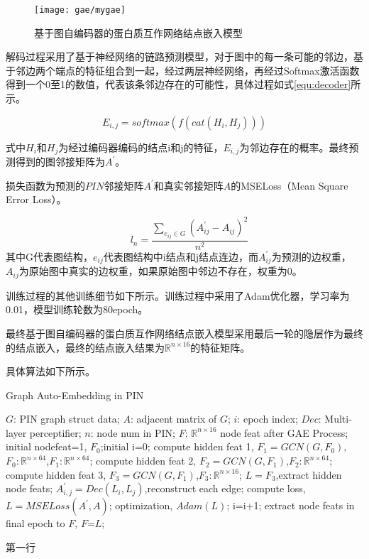 \begin{figure}[htbp]
    \centering
    \texttt{[image: gae/mygae]}
    \caption{基于图自编码器的蛋白质互作网络结点嵌入模型}
    \label{fig:gae/mygae}
\end{figure}

解码过程采用了基于神经网络的链路预测模型，对于图中的每一条可能的邻边，基于邻边两个端点的特征组合到一起，经过两层神经网络，再经过Softmax激活函数得到一个0至1的数值，代表该条邻边存在的可能性，具体过程如式\ref{equ:decoder}所示。

\begin{equation}
    \label{equ:decoder}
    E_{i,j} =softmax(f(cat(H_i,H_j)))
\end{equation}

式中$H_i$和$H_j$为经过编码器编码的结点i和j的特征，$E_{i,j}$为邻边存在的概率。最终预测得到的图邻接矩阵为$A^{\prime}$。


损失函数为预测的$PIN$邻接矩阵$A^{\prime}$和真实邻接矩阵$A$的MSELoss（Mean Square Error Loss）。

\begin{equation}
    \label{equ:autoembedloss}
    \quad l_n =\frac{\sum_{e_{ij}\in G}{  \left( A_{ij}^{\prime} - A_{ij} \right)^2}}{n^2}
\end{equation}
其中G代表图结构，$e_{ij}$代表图结构中i结点和j结点连边，而$A_{ij}^{\prime}$为预测的边权重，$A_{ij}$为原始图中真实的边权重，如果原始图中邻边不存在，权重为0。


训练过程的其他训练细节如下所示。训练过程中采用了Adam优化器，学习率为0.01，模型训练轮数为80epoch。

最终基于图自编码器的蛋白质互作网络结点嵌入模型采用最后一轮的隐层作为最终的结点嵌入，最终的结点嵌入结果为$\mathbb{R}^{n\times 16}$的特征矩阵。

具体算法如下所示。

\begin{algorithm}[h]
    \caption{Graph Auto-Embedding in PIN} %
    \label{alg::gae}
    \begin{algorithmic}[1]
        \Require
        $G$: PIN graph struct data;
        $A$: adjacent matrix of $G$;
        $i$: epoch index;
        $Dec$: Multi-layer perceptifier;
        $n$: node num in PIN;
        \Ensure
        $F$: $\mathbb{R}^{n\times 16}$ node feat after GAE Process;
        \State initial nodefeat=1, $F_0$;initial i=0;
        \Repeat
        \State compute hidden feat 1, $F_1=GCN(G,F_0)$,$F_0:\mathbb{R}^{n\times 64}$,$F_1:\mathbb{R}^{n\times 64}$;
        \State compute hidden feat 2, $F_2=GCN(G,F_1)$,$F_2:\mathbb{R}^{n\times 64}$;
        \State compute hidden feat 3, $F_3=GCN(G,F_1)$,$F_3:\mathbb{R}^{n\times 16}$;
        \State $L=F_3$,extract hidden node feats;
        \State $A_{i,j}^{\prime}=Dec(L_i,L_j)$,reconstruct each edge;
        \EndFor
        \EndFor
        \State compute loss, $L=MSELoss(A^{\prime},A)$;
        \State optimization, $Adam(L)$;
        \State i=i+1;
        \State extract node feats in final epoch to $F$, $F$=$L$;
    \end{algorithmic}
\end{algorithm}
第一行


